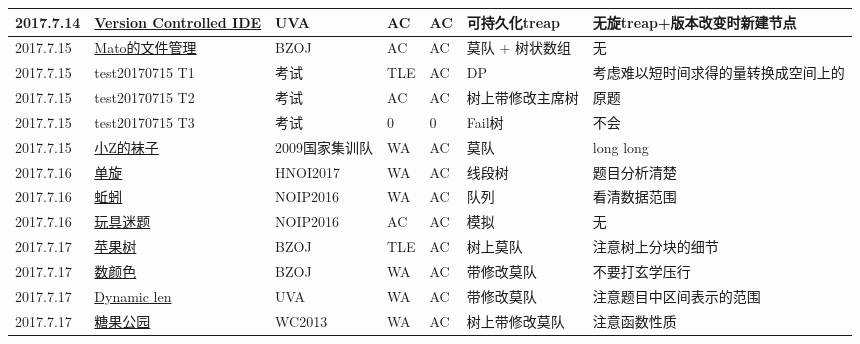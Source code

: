 \documentclass[a4paper]{article}
\begin{document}
\begin{longtable}{|p{1.5cm}|p{2.5cm}|p{1.6cm}|p{1.6cm}|p{1cm}|p{3cm}|p{4cm}|}
		\hline
		2017.7.14 & \href {https://vjudge.net/problem/UVA-12538}{Version Controlled IDE}
		 & UVA & AC & AC & 可持久化treap & 无旋treap+版本改变时新建节点\\
		
		\hline
		2017.7.15 & \href {http://www.lydsy.com/JudgeOnline/problem.php?id=3289}{Mato的文件管理}
		 & BZOJ & AC & AC & 莫队 + 树状数组 & 无\\
		
		\hline
		2017.7.15 & test20170715 T1
		 & 考试 & TLE & AC & DP & 考虑难以短时间求得的量转换成空间上的\\
		
		\hline
		2017.7.15 & test20170715 T2
		 & 考试 & AC & AC & 树上带修改主席树 & 原题\\
		
		\hline
		2017.7.15 & test20170715 T3
		 & 考试 & 0 & 0 & Fail树 & 不会\\
		
		\hline
		2017.7.15 & \href {http://www.lydsy.com/JudgeOnline/problem.php?id=2038}{小Z的袜子}
		 & 2009国家集训队 & WA & AC & 莫队 & long long\\
		
		\hline
		2017.7.16 & \href {http://www.lydsy.com/JudgeOnline/problem.php?id=4825}{单旋}
		 & HNOI2017 & WA & AC & 线段树 & 题目分析清楚\\
		
		\hline
		2017.7.16 & \href {https://www.luogu.org/problem/show?pid=2827}{蚯蚓}
		 & NOIP2016 & WA & AC & 队列 & 看清数据范围\\
		
		\hline
		2017.7.16 & \href {https://www.luogu.org/problem/show?pid=1563}{玩具迷题}
		 & NOIP2016 & AC & AC & 模拟 & 无\\
		
		\hline
		2017.7.17 & \href {http://www.lydsy.com/JudgeOnline/problem.php?id=3757}{苹果树}
		 & BZOJ & TLE & AC & 树上莫队 & 注意树上分块的细节\\
		
		\hline
		2017.7.17 & \href {http://www.lydsy.com/JudgeOnline/problem.php?id=2120}{数颜色}
		 & BZOJ & WA & AC & 带修改莫队 & 不要打玄学压行\\
		
		\hline
		2017.7.17 & \href {https://vjudge.net/problem/UVA-12345}{Dynamic len}
		 & UVA & WA & AC & 带修改莫队 & 注意题目中区间表示的范围\\
		
		\hline
		2017.7.17 & \href {http://uoj.ac/problem/58}{糖果公园}
		 & WC2013 & WA & AC & 树上带修改莫队 & 注意函数性质\\
		

\end{longtable}
\end{document}
